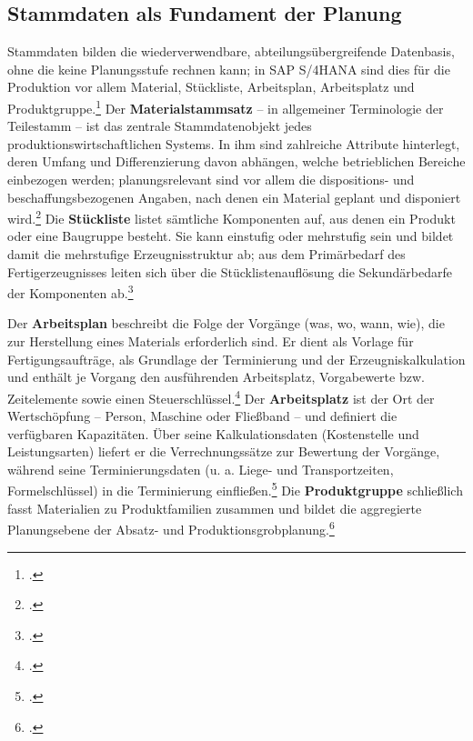 \subsection{Stammdaten als Fundament der Planung}
Stammdaten bilden die wiederverwendbare, abteilungsübergreifende Datenbasis, ohne die keine Planungsstufe rechnen kann; in SAP S/4HANA sind dies für die Produktion vor allem Material, Stückliste, Arbeitsplan, Arbeitsplatz und Produktgruppe.\footcites[Vgl.][S. 43 ff.]{Kurbel.2021}[ergänzend][Folie 11]{SAPUCC.2023} Der \textbf{Materialstammsatz} -- in allgemeiner Terminologie der Teilestamm -- ist das zentrale Stammdatenobjekt jedes produktionswirtschaftlichen Systems. In ihm sind zahlreiche Attribute hinterlegt, deren Umfang und Differenzierung davon abhängen, welche betrieblichen Bereiche einbezogen werden; planungsrelevant sind vor allem die dispositions- und beschaffungsbezogenen Angaben, nach denen ein Material geplant und disponiert wird.\footcites[Vgl.][S. 44 ff.]{Kurbel.2021}[][Folie 12]{SAPUCC.2023} Die \textbf{Stückliste} listet sämtliche Komponenten auf, aus denen ein Produkt oder eine Baugruppe besteht. Sie kann einstufig oder mehrstufig sein und bildet damit die mehrstufige Erzeugnisstruktur ab; aus dem Primärbedarf des Fertigerzeugnisses leiten sich über die Stücklistenauflösung die Sekundärbedarfe der Komponenten ab.\footcites[Vgl.][Folie 13 ff.]{SAPUCC.2023}[][S. 45 ff.]{Kurbel.2021}

Der \textbf{Arbeitsplan} beschreibt die Folge der Vorgänge (was, wo, wann, wie), die zur Herstellung eines Materials erforderlich sind. Er dient als Vorlage für Fertigungsaufträge, als Grundlage der Terminierung und der Erzeugniskalkulation und enthält je Vorgang den ausführenden Arbeitsplatz, Vorgabewerte bzw. Zeitelemente sowie einen Steuerschlüssel.\footcites[Vgl.][Folie 18 f.]{SAPUCC.2023}[][S. 9]{Boldau.2023} Der \textbf{Arbeitsplatz} ist der Ort der Wertschöpfung -- Person, Maschine oder Fließband -- und definiert die verfügbaren Kapazitäten. Über seine Kalkulationsdaten (Kostenstelle und Leistungsarten) liefert er die Verrechnungssätze zur Bewertung der Vorgänge, während seine Terminierungsdaten (u. a. Liege- und Transportzeiten, Formelschlüssel) in die Terminierung einfließen.\footcite[Vgl.][Folie 7 u. 20 f.]{SAPUCC.2023} Die \textbf{Produktgruppe} schließlich fasst Materialien zu Produktfamilien zusammen und bildet die aggregierte Planungsebene der Absatz- und Produktionsgrobplanung.\footcite[Vgl.][Folie 22]{SAPUCC.2023}

